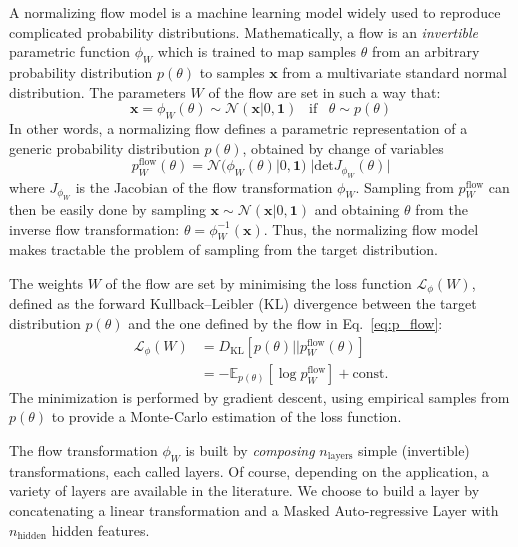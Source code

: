 \documentclass[twocolumn,showpacs,preprintnumbers,nofootinbib,prd,
superscriptaddress,10pt]{revtex4-2}
\begin{document}
A normalizing flow model \cite{norm_flow, nflows_paper, Kobyzev_2021, Papamakarios_thesis} is a machine learning model widely used to reproduce complicated probability distributions.
Mathematically, a flow is an {\it invertible} parametric function $\phi_W$ which is trained to map samples $\theta$ from an arbitrary probability distribution $p(\theta)$ to samples $\mathbf{x}$ from a multivariate standard normal distribution.
The parameters $W$ of the flow are set in such a way that:
\begin{equation}
	\mathbf{x} = \phi_W(\theta) \sim \mathcal{N}(\mathbf{x}|0,\mathbf{1}) \;\;\; \text{if} \;\;\;  \theta \sim p(\theta)
\end{equation}
%
In other words, a normalizing flow defines a parametric representation of a generic probability distribution $p(\theta)$, obtained by change of variables
\begin{equation}\label{eq:p_flow}
	p^\text{flow}_W(\theta) = \mathcal{N}(\phi_W(\theta)|0,\mathbf{1}) \; |\text{det} J_{\phi_W}(\theta)|
\end{equation}
where $J_{\phi_W}$ is the Jacobian of the flow transformation $\phi_W$.
Sampling from $p^\text{flow}_W$ can then be easily done by sampling $\mathbf{x} \sim \mathcal{N}(\mathbf{x}|0,\mathbf{1})$ and obtaining $\theta$ from the inverse flow transformation: $\theta = \phi_W^{-1}(\mathbf{x})$.
Thus, the normalizing flow model makes tractable the problem of sampling from the target distribution.

The weights $W$ of the flow are set by minimising the loss function $\mathcal{L}_\phi(W)$, defined as the forward Kullback–Leibler (KL) divergence between the target distribution $p(\theta)$ and the one defined by the flow in Eq.~\eqref{eq:p_flow}:
\begin{align}
	\mathcal{L}_\phi(W) 	&= D_{\text{KL}}[p(\theta) || p^\text{flow}_W(\theta)] \nonumber \\
					&= - \mathbb{E}_{p(\theta)} [\log p^\text{flow}_W] + \text{const.}
\end{align}
The minimization is performed by gradient descent, using empirical samples from $p(\theta)$ to provide a Monte-Carlo estimation of the loss function.

The flow transformation $\phi_W$ is built by {\it composing} $n_\text{layers}$ simple (invertible) transformations, each called layers. Of course, depending on the application, a variety of layers are available in the literature. We choose to build a layer by concatenating a linear transformation and a Masked Auto-regressive Layer \cite{MADE, MAF,MAF_bis} with $n_\text{hidden}$ hidden features.
\end{document}
